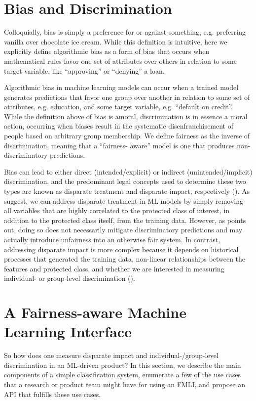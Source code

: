 \documentclass[man,natbib]{apa6}
\begin{document}
\section{Bias and Discrimination}
Colloquially, bias is simply a preference for or against something, e.g.
preferring vanilla over chocolate ice cream. While this definition is
intuitive, here we explicitly define algorithmic bias as a form of bias that
occurs when mathematical rules favor one set of attributes over others in
relation to some target variable, like ``approving'' or ``denying'' a loan.

Algorithmic bias in machine learning models can occur when a trained model
generates predictions that favor one group over another in relation to some set
of attributes, e.g. education, and some target variable, e.g. ``default on
credit''. While the definition above of bias is amoral, discrimination is in
essence a moral action, occurring when biases result in the systematic
disenfranchisement of people based on arbitrary group membership. We define
fairness as the inverse of discrimination, meaning that a ``fairness- aware''
model is one that produces non-discriminatory predictions.

Bias can lead to either direct (intended/explicit) or indirect
(unintended/implicit) discrimination, and the predominant legal concepts used to
determine these two types are known as disparate treatment and disparate impact,
respectively (\citealp{barocas2016big}). As \cite{kusner2017counterfactual,
kamiran2012data} suggest, we can address disparate treatment in ML models by
simply removing all variables that are highly correlated to the protected class
of interest, in addition to the protected class itself, from the training data.
However, as \cite{kusner2017counterfactual} points out, doing so does not
necessarily mitigate discriminatory predictions and may actually introduce
unfairness into an otherwise fair system. In contrast, addressing disparate
impact is more complex because it depends on historical processes that generated
the training data, non-linear relationships between the features and protected
class, and whether we are interested in measuring individual- or group-level
discrimination (\citealp{Dwork:2012:FTA:2090236.2090255}).

\section{A Fairness-aware Machine Learning Interface}

So how does one measure
disparate impact and individual-/group-level discrimination in an ML-driven
product? In this section, we describe the main components of a simple
classification system, enumerate a few of the use cases that a research or
product team might have for using an FMLI, and propose an API that fulfills
these use cases.
\end{document}
